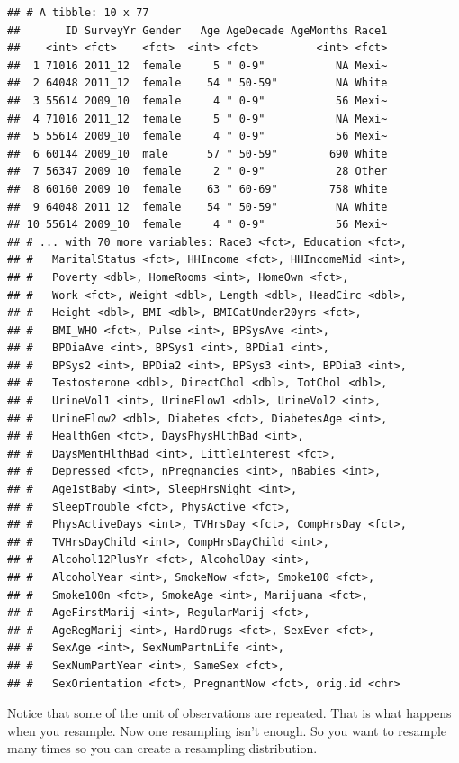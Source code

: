 \documentclass[
]{book}
\begin{document}
\begin{verbatim}
## # A tibble: 10 x 77
##       ID SurveyYr Gender   Age AgeDecade AgeMonths Race1
##    <int> <fct>    <fct>  <int> <fct>         <int> <fct>
##  1 71016 2011_12  female     5 " 0-9"           NA Mexi~
##  2 64048 2011_12  female    54 " 50-59"         NA White
##  3 55614 2009_10  female     4 " 0-9"           56 Mexi~
##  4 71016 2011_12  female     5 " 0-9"           NA Mexi~
##  5 55614 2009_10  female     4 " 0-9"           56 Mexi~
##  6 60144 2009_10  male      57 " 50-59"        690 White
##  7 56347 2009_10  female     2 " 0-9"           28 Other
##  8 60160 2009_10  female    63 " 60-69"        758 White
##  9 64048 2011_12  female    54 " 50-59"         NA White
## 10 55614 2009_10  female     4 " 0-9"           56 Mexi~
## # ... with 70 more variables: Race3 <fct>, Education <fct>,
## #   MaritalStatus <fct>, HHIncome <fct>, HHIncomeMid <int>,
## #   Poverty <dbl>, HomeRooms <int>, HomeOwn <fct>,
## #   Work <fct>, Weight <dbl>, Length <dbl>, HeadCirc <dbl>,
## #   Height <dbl>, BMI <dbl>, BMICatUnder20yrs <fct>,
## #   BMI_WHO <fct>, Pulse <int>, BPSysAve <int>,
## #   BPDiaAve <int>, BPSys1 <int>, BPDia1 <int>,
## #   BPSys2 <int>, BPDia2 <int>, BPSys3 <int>, BPDia3 <int>,
## #   Testosterone <dbl>, DirectChol <dbl>, TotChol <dbl>,
## #   UrineVol1 <int>, UrineFlow1 <dbl>, UrineVol2 <int>,
## #   UrineFlow2 <dbl>, Diabetes <fct>, DiabetesAge <int>,
## #   HealthGen <fct>, DaysPhysHlthBad <int>,
## #   DaysMentHlthBad <int>, LittleInterest <fct>,
## #   Depressed <fct>, nPregnancies <int>, nBabies <int>,
## #   Age1stBaby <int>, SleepHrsNight <int>,
## #   SleepTrouble <fct>, PhysActive <fct>,
## #   PhysActiveDays <int>, TVHrsDay <fct>, CompHrsDay <fct>,
## #   TVHrsDayChild <int>, CompHrsDayChild <int>,
## #   Alcohol12PlusYr <fct>, AlcoholDay <int>,
## #   AlcoholYear <int>, SmokeNow <fct>, Smoke100 <fct>,
## #   Smoke100n <fct>, SmokeAge <int>, Marijuana <fct>,
## #   AgeFirstMarij <int>, RegularMarij <fct>,
## #   AgeRegMarij <int>, HardDrugs <fct>, SexEver <fct>,
## #   SexAge <int>, SexNumPartnLife <int>,
## #   SexNumPartYear <int>, SameSex <fct>,
## #   SexOrientation <fct>, PregnantNow <fct>, orig.id <chr>
\end{verbatim}



Notice that some of the unit of observations are repeated. That is what happens when you resample. Now one resampling isn't enough. So you want to resample many times so you can create a resampling distribution.
\end{document}
